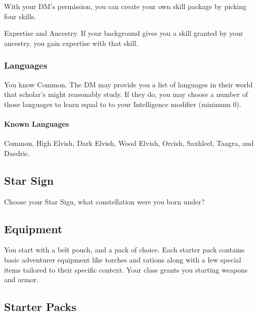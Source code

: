 \documentclass[12pt,letterpaper,twocolumn,openany,nodeprecatedcode,bg=none]{dndbook}
\let\oldsubsection\subsection
\renewcommand{\subsection}[1]{%
  \needspace{5\baselineskip}%
  \oldsubsection{#1}%
}
\begin{document}
With your DM's permission, you can create your own skill package by
picking four skills.

Expertise and Ancestry. If your background gives you a skill granted by
your ancestry, you gain expertise with that skill.

\subsubsection{Languages}\label{languages}

You know Common. The DM may provide you a list of languages in their
world that scholar's might reasonably study. If they do, you may choose
a number of those languages to learn equal to to your Intelligence
modifier (minimum 0).

\paragraph{Known Languages}\label{known-languages}

Common, High Elvish, Dark Elvish, Wood Elvish, Orcish, Saxhleel, Taagra,
and Daedric.

\subsection{Star Sign}\label{star-sign}

Choose your Star Sign, what constellation were you born under?

\subsection{Equipment}\label{equipment}

You start with a belt pouch, and a pack of choice. Each starter pack
contains basic adventurer equipment like torches and rations along with
a few special items tailored to their specific context. Your class
grants you starting weapons and armor.

\onecolumn

\subsection{Starter Packs}\label{starter-packs}

\end{document}
